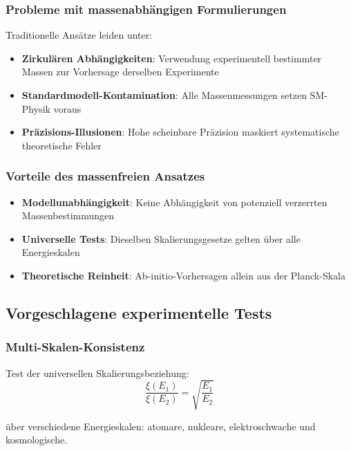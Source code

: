 \documentclass[12pt,a4paper]{article}
\newcommand{\xipar}{\xi}
\begin{document}
	\subsubsection{Probleme mit massenabhängigen Formulierungen}
	
	Traditionelle Ansätze leiden unter:
	\begin{itemize}
		\item \textbf{Zirkulären Abhängigkeiten}: Verwendung experimentell bestimmter Massen zur Vorhersage derselben Experimente
		\item \textbf{Standardmodell-Kontamination}: Alle Massenmessungen setzen SM-Physik voraus
		\item \textbf{Präzisions-Illusionen}: Hohe scheinbare Präzision maskiert systematische theoretische Fehler
	\end{itemize}
	
	\subsubsection{Vorteile des massenfreien Ansatzes}
	
	\begin{itemize}
		\item \textbf{Modellunabhängigkeit}: Keine Abhängigkeit von potenziell verzerrten Massenbestimmungen
		\item \textbf{Universelle Tests}: Dieselben Skalierungsgesetze gelten über alle Energieskalen
		\item \textbf{Theoretische Reinheit}: Ab-initio-Vorhersagen allein aus der Planck-Skala
	\end{itemize}
	
	\subsection{Vorgeschlagene experimentelle Tests}
	\label{subsec:experimental_tests}
	
	\subsubsection{Multi-Skalen-Konsistenz}
	
	Test der universellen Skalierungsbeziehung:
	\begin{equation}
		\frac{\xipar(E_1)}{\xipar(E_2)} = \sqrt{\frac{E_1}{E_2}}
		\label{eq:scaling_test}
	\end{equation}
	
	über verschiedene Energieskalen: atomare, nukleare, elektroschwache und kosmologische.
	
\end{document}
